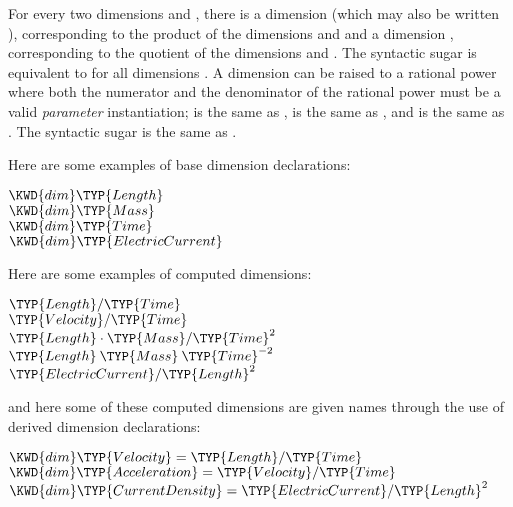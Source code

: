For every two dimensions  and , there is a
dimension  (which may also be written ),
corresponding to the product of the dimensions  and  and a
dimension , corresponding to the quotient of the
dimensions  and . The syntactic sugar  is equivalent
to  for all dimensions .
A dimension can be raised to a rational power where both
the numerator and the denominator of the rational power
must be a valid \emph{ parameter} instantiation;
 is the same as ,
 is the same as , and
 is the same as .
The syntactic sugar  is the same as .

Here are some examples of base dimension declarations:
\begin{Fortress}
\(\KWD{dim} \TYP{Length}\)\\
\(\KWD{dim} \TYP{Mass}\)\\
\(\KWD{dim} \TYP{Time}\)\\
\(\KWD{dim} \TYP{ElectricCurrent}\)
\end{Fortress}
Here are some examples of computed dimensions:
\begin{Fortress}
\(\TYP{Length} / \TYP{Time}\)\\
\(\TYP{Velocity} / \TYP{Time}\)\\
\(\TYP{Length} \cdot \TYP{Mass} / \TYP{Time}^{2}\)\\
\(\TYP{Length}\mskip 4mu plus 4mu\TYP{Mass}\mskip 4mu plus 4mu\TYP{Time}^{-2}\)\\
\(\TYP{ElectricCurrent} / \TYP{Length}^{2}\)
\end{Fortress}
and here some of these computed dimensions are given names through the use of
derived dimension declarations:
\begin{Fortress}
\(\KWD{dim} \TYP{Velocity} = \TYP{Length} / \TYP{Time}\)\\
\(\KWD{dim} \TYP{Acceleration} = \TYP{Velocity} / \TYP{Time}\)\\
\(\KWD{dim} \TYP{CurrentDensity} = \TYP{ElectricCurrent} / \TYP{Length}^{2}\)
\end{Fortress}


